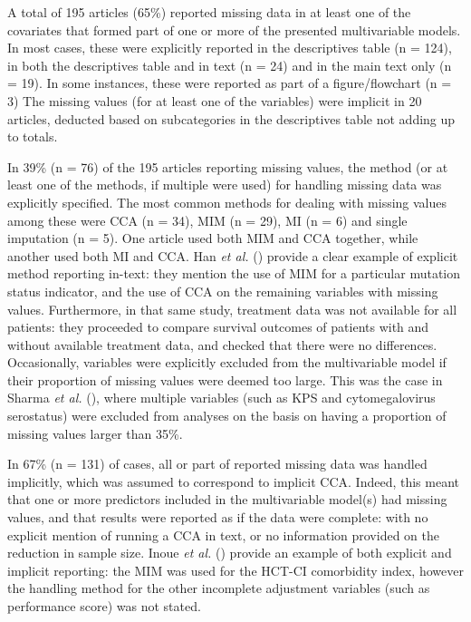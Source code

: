 \documentclass[
  letterpaper,
  DIV=11,
  numbers=noendperiod]{scrreprt}
\begin{document}
A total of 195 articles (65\%) reported missing data in at least one of
the covariates that formed part of one or more of the presented
multivariable models. In most cases, these were explicitly reported in
the descriptives table (n = 124), in both the descriptives table and in
text (n = 24) and in the main text only (n = 19). In some instances,
these were reported as part of a figure/flowchart (n = 3) The missing
values (for at least one of the variables) were implicit in 20 articles,
deducted based on subcategories in the descriptives table not adding up
to totals.

In 39\% (n = 76) of the 195 articles reporting missing values, the
method (or at least one of the methods, if multiple were used) for
handling missing data was explicitly specified. The most common methods
for dealing with missing values among these were CCA (n = 34), MIM (n =
29), MI (n = 6) and single imputation (n = 5). One article used both MIM
and CCA together, while another used both MI and CCA. Han \emph{et al.}
() provide
a clear example of explicit method reporting in-text: they mention the
use of MIM for a particular mutation status indicator, and the use of
CCA on the remaining variables with missing values. Furthermore, in that
same study, treatment data was not available for all patients: they
proceeded to compare survival outcomes of patients with and without
available treatment data, and checked that there were no differences.
Occasionally, variables were explicitly excluded from the multivariable
model if their proportion of missing values were deemed too large. This
was the case in Sharma \emph{et al.}
(), where
multiple variables (such as KPS and cytomegalovirus serostatus) were
excluded from analyses on the basis on having a proportion of missing
values larger than 35\%.

In 67\% (n = 131) of cases, all or part of reported missing data was
handled implicitly, which was assumed to correspond to implicit CCA.
Indeed, this meant that one or more predictors included in the
multivariable model(s) had missing values, and that results were
reported as if the data were complete: with no explicit mention of
running a CCA in text, or no information provided on the reduction in
sample size. Inoue \emph{et al.}
() provide an
example of both explicit and implicit reporting: the MIM was used for
the HCT-CI comorbidity index, however the handling method for the other
incomplete adjustment variables (such as performance score) was not
stated.
\end{document}
